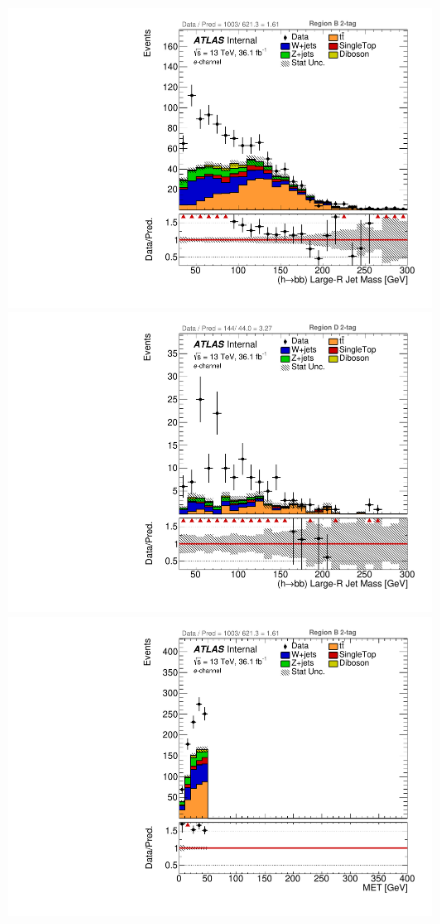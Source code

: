 \begin{figure}[!htbp]
\begin{center}
\includegraphics[scale=0.23]{./figures/boosted/ABCD/elec_Inc_RegionB_HbbMass}
\includegraphics[scale=0.23]{./figures/boosted/ABCD/elec_Inc_RegionD_HbbMass}\\
\includegraphics[scale=0.23]{./figures/boosted/ABCD/elec_Inc_RegionB_MET}

\end{center}
\end{figure}
